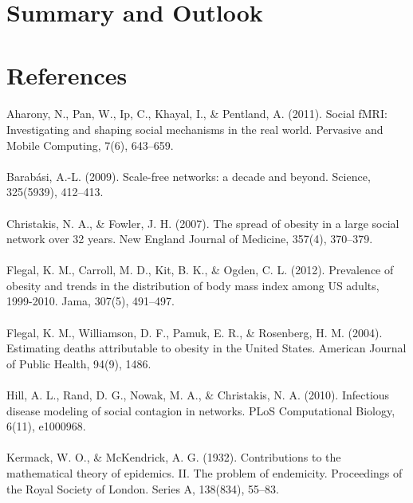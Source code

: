 \documentclass[11pt]{article}
\begin{document}
\section{Summary and Outlook}

\section{References}
\paragraph{}
Aharony, N., Pan, W., Ip, C., Khayal, I., \& Pentland, A. (2011). Social fMRI: Investigating and shaping social mechanisms in the real world. Pervasive and Mobile Computing, 7(6), 643–659.
\paragraph{}
Barabási, A.-L. (2009). Scale-free networks: a decade and beyond. Science, 325(5939), 412–413.
\paragraph{}
Christakis, N. A., \& Fowler, J. H. (2007). The spread of obesity in a large social network over 32 years. New England Journal of Medicine, 357(4), 370–379.
\paragraph{}
Flegal, K. M., Carroll, M. D., Kit, B. K., \& Ogden, C. L. (2012). Prevalence of obesity and trends in the distribution of body mass index among US adults, 1999-2010. Jama, 307(5), 491–497.
\paragraph{}
Flegal, K. M., Williamson, D. F., Pamuk, E. R., \& Rosenberg, H. M. (2004). Estimating deaths attributable to obesity in the United States. American Journal of Public Health, 94(9), 1486.
\paragraph{}
Hill, A. L., Rand, D. G., Nowak, M. A., \& Christakis, N. A. (2010). Infectious disease modeling of social contagion in networks. PLoS Computational Biology, 6(11), e1000968.
\paragraph{}
Kermack, W. O., & McKendrick, A. G. (1932). Contributions to the mathematical theory of epidemics. II. The problem of endemicity. Proceedings of the Royal Society of London. Series A, 138(834), 55–83.
\end{document}
